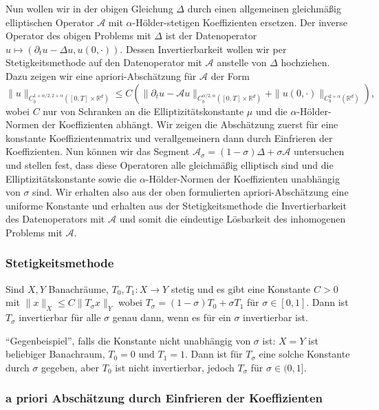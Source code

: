 \documentclass[11pt,a4paper]{scrartcl}
\newcommand{\R}{\mathbb{R}} %
\newcommand{\A}{\mathcal{A}}
\theoremstyle{plain}
\theoremstyle{definition}
\theoremstyle{remark}
\begin{document}
Nun wollen wir in der obigen Gleichung $\Delta$ durch einen allgemeinen gleichmäßig elliptischen Operator $\A$ mit $\alpha$-Hölder-stetigen Koeffizienten ersetzen. Der inverse Operator des obigen Problems mit $\Delta$ ist der Datenoperator $u\mapsto (\partial_t u - \Delta u, u(0,\cdot))$. Dessen Invertierbarkeit wollen wir per Stetigkeitsmethode auf den Datenoperator mit $\A$ anstelle von $\Delta$ hochziehen. Dazu zeigen wir eine apriori-Abschätzung für $\A$ der Form $$\|u\|_{C_b^{1+\alpha/2,2+\alpha}([0,T]\times \R^d)} \leq C \left( \|\partial_t u - \A u\|_{C_b^{\alpha/2,\alpha}([0,T]\times \R^d)} + \|u(0,\cdot)\|_{C_b^{2+\alpha}(\R^d)} \right),$$ wobei $C$ nur von Schranken an die Elliptizitätskonstante $\mu$ und die $\alpha$-Hölder-Normen der Koeffizienten abhängt. Wir zeigen die Abschätzung zuerst für eine konstante Koeffizientenmatrix und verallgemeinern dann durch Einfrieren der Koeffizienten. Nun können wir das Segment $\A_\sigma = (1-\sigma)\Delta + \sigma \A$ untersuchen und stellen fest, dass diese Operatoren alle gleichmäßig elliptisch sind und die Elliptizitätskonstante sowie die $\alpha$-Hölder-Normen der Koeffizienten unabhängig von $\sigma$ sind. Wir erhalten also aus der oben formulierten apriori-Abschätzung eine uniforme Konstante und erhalten aus der Stetigkeitsmethode die Invertierbarkeit des Datenoperators mit $\A$ und somit die eindeutige Lösbarkeit des inhomogenen Problems mit $\A$.

\subsubsection{Stetigkeitsmethode}

Sind $X,Y$ Banachräume, $T_0,T_1:X\to Y$ stetig und es gibt eine Konstante $C>0$ mit $\|x\|_X \leq C \|T_\sigma x\|_Y$ wobei $T_\sigma = (1-\sigma) T_0 + \sigma T_1$ für $\sigma\in [0,1]$. Dann ist $T_\sigma$ invertierbar für alle $\sigma$ genau dann, wenn es für ein $\sigma$ invertierbar ist.

\enquote{Gegenbeispiel}, falls die Konstante nicht unabhängig von $\sigma$ ist: $X=Y$ ist beliebiger Banachraum, $T_0=0$ und $T_1=1$. Dann ist für $T_\sigma$ eine solche Konstante durch $\sigma$ gegeben, aber $T_0$ ist nicht invertierbar, jedoch $T_\sigma$ für $\sigma\in (0,1]$.

\subsubsection{a priori Abschätzung durch Einfrieren der Koeffizienten}
\end{document}
